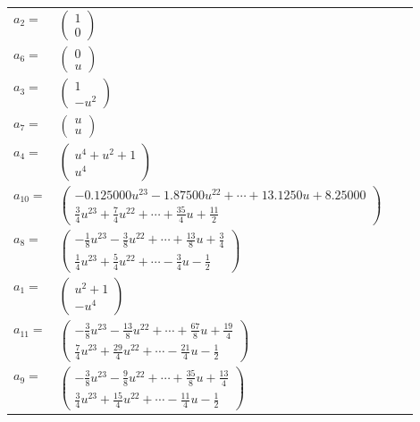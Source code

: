 \documentclass[1p]{elsarticle_modified}
\theoremstyle{definition}
\begin{document}
\begin{tabular}{m{7pt} m{180pt} m{7pt} m{180pt} }
\flushright $a_{2}=$&$\begin{pmatrix}1\\0\end{pmatrix}$ \\
\flushright $a_{6}=$&$\begin{pmatrix}0\\u\end{pmatrix}$ \\
\flushright $a_{3}=$&$\begin{pmatrix}1\\- u^2\end{pmatrix}$ \\
\flushright $a_{7}=$&$\begin{pmatrix}u\\u\end{pmatrix}$ \\
\flushright $a_{4}=$&$\begin{pmatrix}u^4+u^2+1\\u^4\end{pmatrix}$ \\
\flushright $a_{10}=$&$\begin{pmatrix}-0.125000 u^{23}-1.87500 u^{22}+\cdots+13.1250 u+8.25000\\\frac{3}{4} u^{23}+\frac{7}{4} u^{22}+\cdots+\frac{35}{4} u+\frac{11}{2}\end{pmatrix}$ \\
\flushright $a_{8}=$&$\begin{pmatrix}-\frac{1}{8} u^{23}-\frac{3}{8} u^{22}+\cdots+\frac{13}{8} u+\frac{3}{4}\\\frac{1}{4} u^{23}+\frac{5}{4} u^{22}+\cdots-\frac{3}{4} u-\frac{1}{2}\end{pmatrix}$ \\
\flushright $a_{1}=$&$\begin{pmatrix}u^2+1\\- u^4\end{pmatrix}$ \\
\flushright $a_{11}=$&$\begin{pmatrix}-\frac{3}{8} u^{23}-\frac{13}{8} u^{22}+\cdots+\frac{67}{8} u+\frac{19}{4}\\\frac{7}{4} u^{23}+\frac{29}{4} u^{22}+\cdots-\frac{21}{4} u-\frac{1}{2}\end{pmatrix}$ \\
\flushright $a_{9}=$&$\begin{pmatrix}-\frac{3}{8} u^{23}-\frac{9}{8} u^{22}+\cdots+\frac{35}{8} u+\frac{13}{4}\\\frac{3}{4} u^{23}+\frac{15}{4} u^{22}+\cdots-\frac{11}{4} u-\frac{1}{2}\end{pmatrix}$ \\

\end{tabular}
\end{document}
